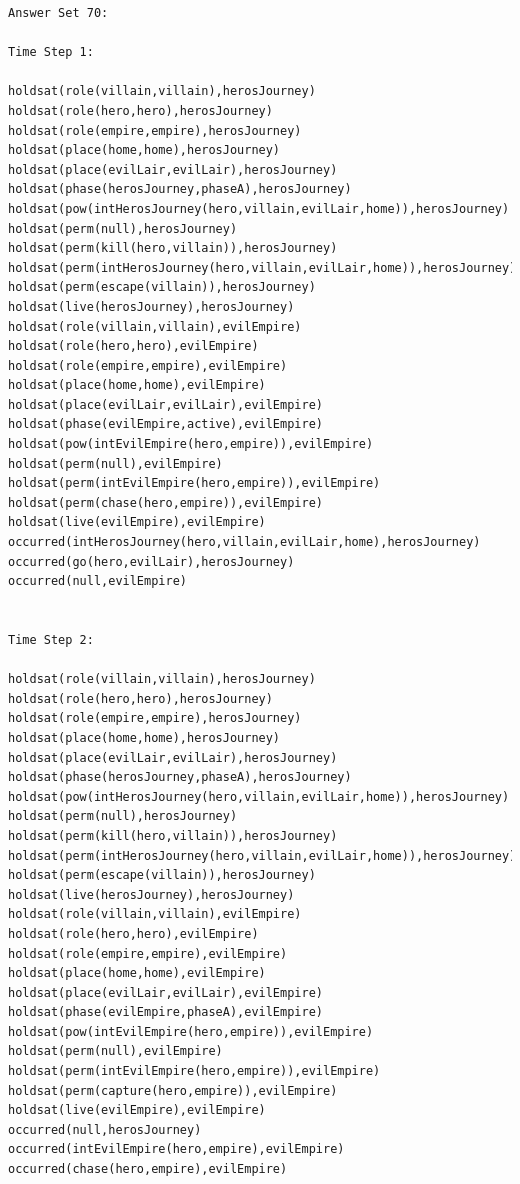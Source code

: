 \documentclass[11pt]{report}
\begin{document}
\begin{lstlisting}[label={lst:hero-evil-trace},caption={Example trace for both the ``Evil Empire'' and
``Hero's Journey'' tropes combined together}]
Answer Set 70:

Time Step 1:

holdsat(role(villain,villain),herosJourney)
holdsat(role(hero,hero),herosJourney)
holdsat(role(empire,empire),herosJourney)
holdsat(place(home,home),herosJourney)
holdsat(place(evilLair,evilLair),herosJourney)
holdsat(phase(herosJourney,phaseA),herosJourney)
holdsat(pow(intHerosJourney(hero,villain,evilLair,home)),herosJourney)
holdsat(perm(null),herosJourney)
holdsat(perm(kill(hero,villain)),herosJourney)
holdsat(perm(intHerosJourney(hero,villain,evilLair,home)),herosJourney)
holdsat(perm(escape(villain)),herosJourney)
holdsat(live(herosJourney),herosJourney)
holdsat(role(villain,villain),evilEmpire)
holdsat(role(hero,hero),evilEmpire)
holdsat(role(empire,empire),evilEmpire)
holdsat(place(home,home),evilEmpire)
holdsat(place(evilLair,evilLair),evilEmpire)
holdsat(phase(evilEmpire,active),evilEmpire)
holdsat(pow(intEvilEmpire(hero,empire)),evilEmpire)
holdsat(perm(null),evilEmpire)
holdsat(perm(intEvilEmpire(hero,empire)),evilEmpire)
holdsat(perm(chase(hero,empire)),evilEmpire)
holdsat(live(evilEmpire),evilEmpire)
occurred(intHerosJourney(hero,villain,evilLair,home),herosJourney)
occurred(go(hero,evilLair),herosJourney)
occurred(null,evilEmpire)


Time Step 2:

holdsat(role(villain,villain),herosJourney)
holdsat(role(hero,hero),herosJourney)
holdsat(role(empire,empire),herosJourney)
holdsat(place(home,home),herosJourney)
holdsat(place(evilLair,evilLair),herosJourney)
holdsat(phase(herosJourney,phaseA),herosJourney)
holdsat(pow(intHerosJourney(hero,villain,evilLair,home)),herosJourney)
holdsat(perm(null),herosJourney)
holdsat(perm(kill(hero,villain)),herosJourney)
holdsat(perm(intHerosJourney(hero,villain,evilLair,home)),herosJourney)
holdsat(perm(escape(villain)),herosJourney)
holdsat(live(herosJourney),herosJourney)
holdsat(role(villain,villain),evilEmpire)
holdsat(role(hero,hero),evilEmpire)
holdsat(role(empire,empire),evilEmpire)
holdsat(place(home,home),evilEmpire)
holdsat(place(evilLair,evilLair),evilEmpire)
holdsat(phase(evilEmpire,phaseA),evilEmpire)
holdsat(pow(intEvilEmpire(hero,empire)),evilEmpire)
holdsat(perm(null),evilEmpire)
holdsat(perm(intEvilEmpire(hero,empire)),evilEmpire)
holdsat(perm(capture(hero,empire)),evilEmpire)
holdsat(live(evilEmpire),evilEmpire)
occurred(null,herosJourney)
occurred(intEvilEmpire(hero,empire),evilEmpire)
occurred(chase(hero,empire),evilEmpire)



\end{lstlisting}
\end{document}

